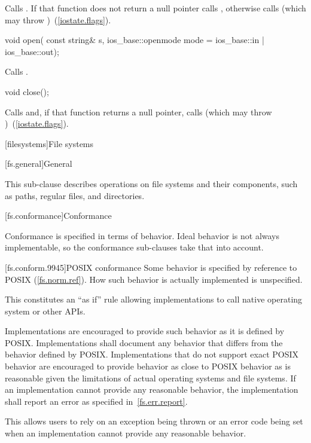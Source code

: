 \begin{itemdescr}
\pnum
\effects
Calls
.
If that function does not return a null pointer calls ,
otherwise calls
(which may throw
)~(\ref{iostate.flags}).
\end{itemdescr}

%
\begin{itemdecl}
void open(
  const string& s,
  ios_base::openmode mode = ios_base::in | ios_base::out);
\end{itemdecl}

\begin{itemdescr}
\pnum
\effects Calls .
\end{itemdescr}

%
\begin{itemdecl}
void close();
\end{itemdecl}

\begin{itemdescr}
\pnum
\effects
Calls
and, if that function
returns a null pointer,
calls
(which may throw
)~(\ref{iostate.flags}).
\end{itemdescr}

[filesystems]{File systems}

[fs.general]{General}

\pnum
This sub-clause describes operations on file systems and their components, such as paths,
regular files, and directories.

[fs.conformance]{Conformance}

\pnum
Conformance is specified in terms of behavior. Ideal behavior is not always
implementable, so the conformance sub-clauses take that into account.

[fs.conform.9945]{POSIX conformance}
\pnum
Some behavior is specified by reference to POSIX (\ref{fs.norm.ref}). How such behavior is actually implemented is unspecified.
\begin{note} This constitutes an ``as if'' rule allowing implementations
to call native
operating system or other APIs. \end{note}

\pnum
Implementations are encouraged to provide such behavior as it is defined by
POSIX. Implementations shall document any behavior that differs from the
behavior defined by POSIX. Implementations that do not support exact POSIX
behavior are encouraged to provide behavior as close to POSIX behavior as is reasonable given the
limitations of actual operating systems and file systems. If an implementation cannot provide any
reasonable behavior, the implementation shall report an error as specified in~\ref{fs.err.report}.
\begin{note} This allows users to rely on an exception being thrown or
an error code being set when an implementation cannot provide any reasonable
behavior.\end{note}


